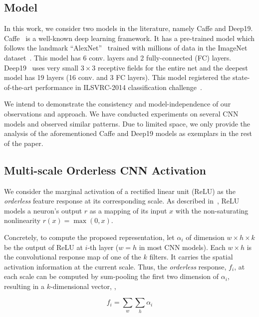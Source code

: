 \documentclass[10pt,twocolumn,letterpaper]{article}
\begin{document}
\subsection{Model}

In this work, we consider two models in the literature, namely Caffe and Deep19. Caffe~\cite{Caffe} is a well-known deep learning framework. It has a pre-trained model which follows the landmark ``AlexNet''~\cite{AlexNet} trained with millions of data in the ImageNet dataset~\cite{ImageNet}. This model has 6 conv. layers and 2 fully-connected (FC) layers. Deep19~\cite{veryDeep} uses very small $3\times 3$ receptive fields for the entire net and the deepest model has 19 layers (16 conv. and 3 FC layers). This model registered the state-of-the-art performance in ILSVRC-2014 classification challenge~\cite{ILSVRC14}. 

We intend to demonstrate the consistency and model-independence of our observations and approach. We have conducted experiments on several CNN models and observed similar patterns. Due to limited space, we only provide the analysis of the aforementioned Caffe and Deep19 models as exemplars in the rest of the paper. 

\subsection{Multi-scale Orderless CNN Activation\label{sec:definition}}

We consider the marginal activation of a rectified linear unit (ReLU) as the \textit{orderless} feature response at its corresponding scale. As described in~\cite{ReLU,AlexNet}, ReLU models a neuron's output $r$ as a mapping of its input $x$ with the non-saturating nonlinearity $r(x)=\max (0,x)$. 

Concretely, to compute the proposed representation, let $\alpha_i$ of dimension $w\times h\times k$ be the output of ReLU at $i$-th layer ($w=h$ in most CNN models). Each $w\times h$ is the convolutional response map of one of the $k$ filters. It carries the spatial activation information at the current scale. Thus, the \textit{orderless} response, $f_i$, at each scale can be computed by sum-pooling the first two dimension of $\alpha_i$, resulting in a $k$-dimensional vector, \ie,

\begin{equation}
f_i=\sum_w \sum_h \alpha_i
\end{equation}
\end{document}
